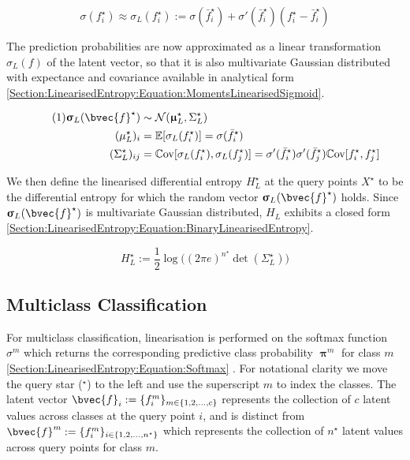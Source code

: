 \documentclass{article}
\renewcommand{\vec}[1]{\boldsymbol{#1}}
\newcommand\numberthis{\addtocounter{equation}{1}\tag{\theequation}}
\begin{document}
			\begin{equation}
				\sigma(f^{\star}_{i}) \approx \sigma_{L}(f^{\star}_{i}) := \sigma(\bar{f}^{\star}_{i}) + \sigma'(\bar{f}^{\star}_{i}) (f^{\star}_{i} - \bar{f}^{\star}_{i})
			\label{Section:LinearisedEntropy:Equation:LinearisingSigmoid}
			\end{equation}
			
			The prediction probabilities are now approximated as a linear transformation $\sigma_{L}(f)$ of the latent vector, so that it is also multivariate Gaussian distributed with expectance and covariance available in analytical form \eqref{Section:LinearisedEntropy:Equation:MomentsLinearisedSigmoid}.
			
			\begin{align*}
			\numberthis \label{Section:LinearisedEntropy:Equation:MomentsLinearisedSigmoid}
					\vec{\upsigma}_{L}(\bvec{f}^{\star}) & \sim \mathcal{N}(\vec{\upmu}^{\star}_{L}, \Sigma^{\star}_{L}) \\
					({\mu^{\star}_{L}})_{i} & = \mathbb{E}[\sigma_{L}(f^{\star}_{i})] = \sigma(\bar{f}^{\star}_{i}) \\
					({\Sigma^{\star}_{L}})_{ij} & = \mathbb{C}\mathrm{ov}[\sigma_{L}(f^{\star}_{i}), \sigma_{L}(f^{\star}_{j})] = \sigma'(\bar{f}^{\star}_{i}) \sigma'(\bar{f}^{\star}_{j}) \mathbb{C}\mathrm{ov}[f^{\star}_{i}, f^{\star}_{j}]
			\end{align*}
			
			We then define the linearised differential entropy $H^{\star}_{L}$ at the query points $X^{\star}$ to be the differential entropy for which the random vector $\vec{\upsigma}_{L}(\bvec{f}^{\star})$ holds. Since $\vec{\upsigma}_{L}(\bvec{f}^{\star})$ is multivariate Gaussian distributed, $H_{L}$ exhibits a closed form \eqref{Section:LinearisedEntropy:Equation:BinaryLinearisedEntropy}.
			
			\begin{equation}
				H^{\star}_{L} := \frac{1}{2} \log\Big((2 \pi e)^{n^{\star}} \det(\Sigma^{\star}_{L})\Big)
			\label{Section:LinearisedEntropy:Equation:BinaryLinearisedEntropy}
			\end{equation}			
					
	\subsection{Multiclass Classification}
			
		For multiclass classification, linearisation is performed on the softmax function $\sigma^{m}$ which returns the corresponding predictive class probability $\vec{\uppi}^{m}$ for class $m$ \eqref{Section:LinearisedEntropy:Equation:Softmax} \cite{GaussianProcessForMachineLearning}. For notational clarity we move the query star ($^\star$) to the left and use the superscript $m$ to index the classes. The latent vector $\bvec{f}_{i} := \{f^{m}_{i}\}_{m \in \{1, 2, \dots, c\}}$ represents the collection of $c$ latent values across classes at the query point $i$, and is distinct from $\bvec{f}^{m} := \{f^{m}_{i}\}_{i \in \{1, 2, \dots, n^{\star}\}}$ which represents the collection of $n^{\star}$ latent values across query points for class $m$.
\end{document}
